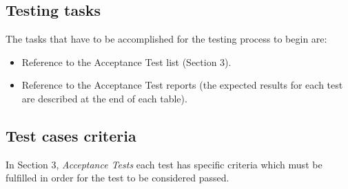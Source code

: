 \subsection{Testing tasks}
The tasks that have to be accomplished for the testing process to begin are:
\begin{itemize}
	\item Reference to the Acceptance Test list (Section 3).
	\item Reference to the Acceptance Test reports (the expected results for each test are described at the end of each table).
\end{itemize}

\subsection{Test cases criteria}
In Section 3, \textit{Acceptance Tests} each test has specific criteria which must be fulfilled in order for the test to be considered passed. 